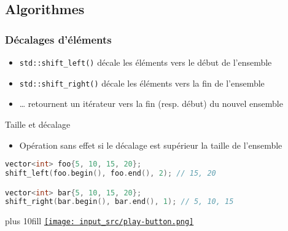 \documentclass[C++.tex]{subfiles}
\begin{document}
\subsection*{Algorithmes}
\begin{frame}[fragile]
	\frametitle{Décalages d'éléments}
	\begin{itemize}
		\item \lstinline|std::shift_left()| décale les éléments vers le début de l'ensemble
		\item \lstinline|std::shift_right()| décale les éléments vers la fin de l'ensemble
		\item \ldots{} retournent un itérateur vers la fin (resp. début) du nouvel ensemble
	\end{itemize}

	\begin{block}{Taille et décalage}
		\begin{itemize}
			\item Opération sans effet si le décalage est supérieur la taille de l'ensemble
		\end{itemize}
	\end{block}

	\begin{lstlisting}[language=C++]
vector<int> foo{5, 10, 15, 20};
shift_left(foo.begin(), foo.end(), 2); // 15, 20

vector<int> bar{5, 10, 15, 20};
shift_right(bar.begin(), bar.end(), 1); // 5, 10, 15\end{lstlisting}

	\vskip 10mm plus 10fill
	\hfill
	\href{https://godbolt.org/#g:!((g:!((g:!((h:codeEditor,i:(filename:'1',fontScale:14,fontUsePx:'0',j:1,lang:c%2B%2B,selection:(endColumn:19,endLineNumber:9,positionColumn:19,positionLineNumber:9,selectionStartColumn:19,selectionStartLineNumber:9,startColumn:19,startLineNumber:9),source:'%23include+%3Cvector%3E%0A%23include+%3Calgorithm%3E%0A%23include+%3Ciostream%3E%0A%0Aint+main()%0A%7B%0A++std::vector%3Cint%3E+foo%7B5,+10,+15,+20%7D%3B%0A++std::shift_left(foo.begin(),+foo.end(),+2)%3B%0A++//+%7B15,+20,+%3F,+%3F%7D%0A++for(int+i+:+foo)%0A++%7B%0A++++std::cout+%3C%3C+i+%3C%3C+%22+%22%3B%0A++%7D%0A++std::cout+%3C%3C+%22%5Cn%22%3B%0A%0A++std::vector%3Cint%3E+bar%7B5,+10,+15,+20%7D%3B%0A++std::shift_right(bar.begin(),+bar.end(),+1)%3B%0A++//+%7B%3F,+5,+10,+15%7D%0A++for(int+i+:+bar)%0A++%7B%0A++++std::cout+%3C%3C+i+%3C%3C+%22+%22%3B%0A++%7D%0A++std::cout+%3C%3C+%22%5Cn%22%3B%0A%7D%0A'),l:'5',n:'0',o:'C%2B%2B+source+%231',t:'0')),k:50,l:'4',n:'0',o:'',s:0,t:'0'),(g:!((h:executor,i:(argsPanelShown:'1',compilationPanelShown:'0',compiler:g122,compilerName:'',compilerOutShown:'0',execArgs:'',execStdin:'',fontScale:14,fontUsePx:'0',j:1,lang:c%2B%2B,libs:!((name:boost,ver:'175')),options:'-std%3Dc%2B%2B20+-Wall+-Wextra+-pedantic',source:1,stdinPanelShown:'1',tree:'1',wrap:'0'),l:'5',n:'0',o:'Executor+x86-64+gcc+12.2+(C%2B%2B,+Editor+%231)',t:'0')),header:(),k:50,l:'4',n:'0',o:'',s:0,t:'0')),l:'2',n:'0',o:'',t:'0')),version:4}{\texttt{[image: input\_src/play-button.png]}}
\end{frame}
\end{document}
